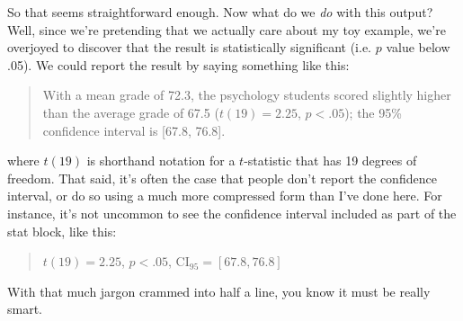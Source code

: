 So that seems straightforward enough. Now what do we {\it do} with this output? Well, since we're pretending that we actually care about my toy example, we're overjoyed to discover that the result is statistically significant (i.e. $p$ value below .05). We could report the result by saying something like this:
\begin{quote}
With a mean grade of 72.3, the psychology students scored slightly higher than the average grade of 67.5 ($t(19) = 2.25$, $p<.05$); the 95\% confidence interval is [67.8, 76.8].
\end{quote}
where $t(19)$ is shorthand notation for a $t$-statistic that has 19 degrees of freedom. That said, it's often the case that people don't report the confidence interval, or do so using a much more compressed form than I've done here. For instance, it's not uncommon to see the confidence interval included as part of the stat block, like this:
\begin{quote}
$t(19) = 2.25$, $p<.05$, CI$_{95} = [67.8, 76.8]$
\end{quote}
With that much jargon crammed into half a line, you know it must be really smart.




